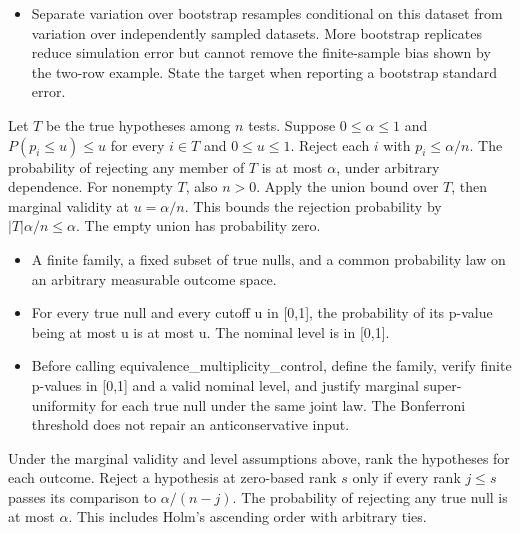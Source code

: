 \expandafter\def\csname statadic@diagnostics@STATADIC-BOOTSTRAP-002\endcsname{\begin{itemize}
\item Separate variation over bootstrap resamples conditional on this dataset from variation over independently sampled datasets. More bootstrap replicates reduce simulation error but cannot remove the finite-sample bias shown by the two-row example. State the target when reporting a bootstrap standard error.
\end{itemize}}
\expandafter\def\csname statadic@statement@STATADIC-MULTIPLICITY-001\endcsname{Let $T$ be the true hypotheses among $n$ tests. Suppose
  $0\le\alpha\le1$ and $P(p_i\le u)\le u$ for every $i\in T$ and
  $0\le u\le1$. Reject each $i$ with $p_i\le\alpha/n$. The probability of
  rejecting any member of $T$ is at most $\alpha$, under arbitrary dependence.}
\expandafter\def\csname statadic@proof@STATADIC-MULTIPLICITY-001\endcsname{For nonempty $T$, also $n>0$. Apply the union bound over $T$,
  then marginal validity at $u=\alpha/n$. This bounds the rejection probability
  by $|T|\alpha/n\le\alpha$. The empty union has probability zero.}
\expandafter\def\csname statadic@assumptions@STATADIC-MULTIPLICITY-001\endcsname{\begin{itemize}
\item A finite family, a fixed subset of true nulls, and a common probability law on an arbitrary measurable outcome space.
\item For every true null and every cutoff u in [0,1], the probability of its p-value being at most u is at most u. The nominal level is in [0,1].
\end{itemize}}
\expandafter\def\csname statadic@diagnostics@STATADIC-MULTIPLICITY-001\endcsname{\begin{itemize}
\item Before calling equivalence\_multiplicity\_control, define the family, verify finite p-values in [0,1] and a valid nominal level, and justify marginal super-uniformity for each true null under the same joint law. The Bonferroni threshold does not repair an anticonservative input.
\end{itemize}}
\expandafter\def\csname statadic@statement@STATADIC-MULTIPLICITY-002\endcsname{Under the marginal validity and level assumptions above,
  rank the hypotheses for each outcome. Reject a hypothesis at zero-based
  rank $s$ only if every rank $j\le s$ passes its comparison to
  $\alpha/(n-j)$. The probability of rejecting any true null is at most
  $\alpha$. This includes Holm's ascending order with arbitrary ties.}
